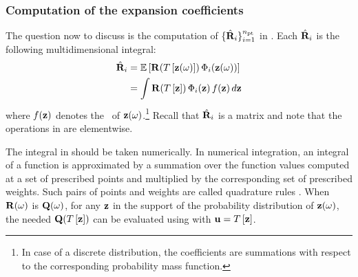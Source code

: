 \subsubsection{Computation of the expansion coefficients}
The question now to discuss is the computation of $\{ \hat{\mathbf{R}}_i \}_{i = 1}^{n_\text{pt}}$ in .
Each $\hat{\mathbf{R}}_i$ is the following multidimensional integral:
\begin{align}
  \pcc{\mR}_i & = \oExpectation{\mR(\oTransform{\vZ(\o)}) \, \pcb_i(\vZ(\o))} \nonumber \\
  & = \int \mR(\oTransform{\vZ}) \, \pcb_i(\vZ) \, \fPDF(\vZ) \, \d\vZ \elab{polynomial-chaos-coefficients}
\end{align}
where $f(\mathbf{z})$ denotes the \pdf\ of $\mathbf{z}(\omega)$.\footnote{In case of a discrete distribution, the coefficients are summations with respect to the corresponding probability mass function.}
Recall that $\hat{\mathbf{R}}_i$ is a matrix and note that the operations in  are elementwise.

The integral in  should be taken numerically.
In numerical integration, an integral of a function is approximated by a summation over the function values computed at a set of prescribed points and multiplied by the corresponding set of prescribed weights.
Such pairs of points and weights are called quadrature rules \cite{press2007}.
When $\mathbf{R}(\omega)$ is $\mathbf{Q}(\omega)$, for any $\mathbf{z}$ in the support of the probability distribution of $\mathbf{z}(\omega)$, the needed $\mQ(\oTransform{\vZ})$ can be evaluated using  with $\vU = \oTransform{\vZ}$.
